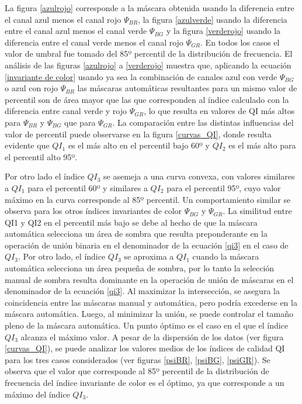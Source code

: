 

La figura \ref{azulrojo} corresponde a la máscara obtenida usando la diferencia entre el canal azul menos el canal rojo $\Psi_{BR}$, la figura \ref{azulverde} usando la diferencia entre el canal azul menos el canal verde $\Psi_{BG}$ y la figura \ref{verderojo} usando la diferencia entre el canal verde menos el canal rojo $\Psi_{GR}$. En todos los casos el valor de umbral fue tomado del 85º percentil de la distribución de frecuencia. El análisis de las figuras \ref{azulrojo} a \ref{verderojo} muestra que, aplicando la ecuación \ref{invariante de color} usando ya sea la combinación de canales azul con verde $\Psi_{BG}$ o azul con rojo $\Psi_{BR}$  las máscaras automáticas resultantes para un mismo valor de percentil son de área mayor que las que corresponden al índice calculado con la diferencia entre canal verde y rojo $\Psi_{GR}$, lo que resulta en valores de QI más altos para $\Psi_{BR}$ y $\Psi_{BG}$ que para $\Psi_{GR}$. La comparación entre las distintas influencias del valor de percentil puede observarse en la figura \ref{curvas_QI}, donde resulta evidente que $QI_1$ es el más alto en el percentil bajo 60º y $QI_2$ es el más alto para el percentil alto 95º. 

Por otro lado el índice $QI_3$ se asemeja a una curva convexa, con valores similares a $QI_1$ para el percentil 60º y similares a $QI_2$ para el percentil 95º, cuyo valor máximo en la curva corresponde al 85º percentil. Un comportamiento similar se observa para los otros índices invariantes de color $\Psi_{BG}$ y $\Psi_{GR}$. La similitud entre QI1 y QI2 en el percentil más bajo se debe al hecho de que la máscara automática selecciona un área de sombra que resulta preponderante en la operación de unión binaria en el denominador de la ecuación \ref{qi3} en el caso de $QI_3$.
Por otro lado, el índice $QI_3$ se aproxima a $QI_1$ cuando la máscara automática selecciona un área pequeña de sombra, por lo tanto la selección manual de sombra resulta dominante en la operación de unión de máscaras en el denominador de la ecuación \ref{qi3}.
Al maximizar la intersección, se asegura la coincidencia entre las máscaras manual y automática, pero podría excederse en la máscara automática. Luego, al minimizar la unión, se puede controlar el tamaño pleno de la máscara automática. Un punto óptimo es el caso en el que el índice $QI_3$ alcanza el máximo valor. A pesar de la dispersión de los datos (ver figura \ref{curvas_QI}), se puede analizar los valores medios de los índices de calidad QI para los tres casos considerados (ver figuras \ref{psiBR}, \ref{psiBG}, \ref{psiGR}). Se observa que el valor que corresponde al 85º percentil de la distribución de frecuencia del índice invariante de color es el óptimo, ya que corresponde a un máximo del índice $QI_3$.

